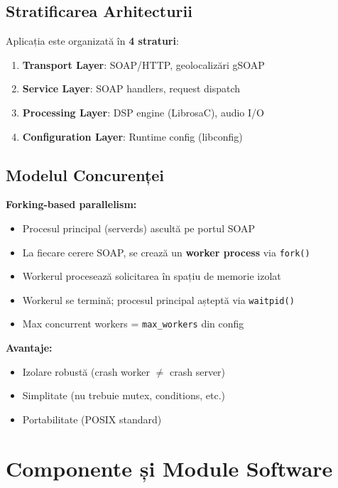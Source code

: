 \documentclass[12pt,a4paper,twoside]{article}
\begin{document}
\subsection{Stratificarea Arhitecturii}

Aplicația este organizată în \textbf{4 straturi}:

\begin{enumerate}
    \item \textbf{Transport Layer}: SOAP/HTTP, geolocalizări gSOAP
    \item \textbf{Service Layer}: SOAP handlers, request dispatch
    \item \textbf{Processing Layer}: DSP engine (LibrosaC), audio I/O
    \item \textbf{Configuration Layer}: Runtime config (libconfig)
\end{enumerate}

\subsection{Modelul Concurenței}

\textbf{Forking-based parallelism:}

\begin{itemize}
    \item Procesul principal (serverds) ascultă pe portul SOAP
    \item La fiecare cerere SOAP, se crează un \textbf{worker process} via \texttt{fork()}
    \item Workerul procesează solicitarea în spațiu de memorie izolat
    \item Workerul se termină; procesul principal așteptă via \texttt{waitpid()}
    \item Max concurrent workers = \texttt{max\_workers} din config
\end{itemize}

\textbf{Avantaje:}
\begin{itemize}
    \item Izolare robustă (crash worker $\neq$ crash server)
    \item Simplitate (nu trebuie mutex, conditions, etc.)
    \item Portabilitate (POSIX standard)
\end{itemize}

\section{Componente și Module Software}
\end{document}
